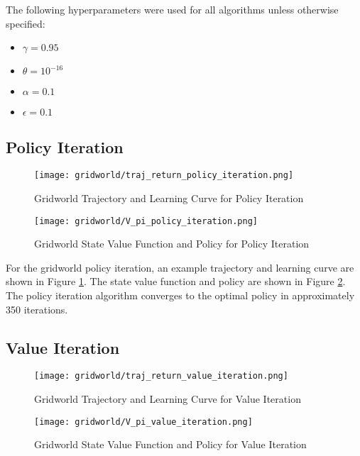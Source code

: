 The following hyperparameters were used for all algorithms unless otherwise specified:
\begin{itemize}
    \item $\gamma = 0.95$
    \item $\theta = 10^{-16}$
    \item $\alpha = 0.1$
    \item $\epsilon = 0.1$
\end{itemize}

\subsection*{Policy Iteration}
\begin{figure}[ht]
\centering
\texttt{[image: gridworld/traj\_return\_policy\_iteration.png]}
\caption{Gridworld Trajectory and Learning Curve for Policy Iteration}
\label{fig:gridworld_traj_return_policy_iteration}
\end{figure}

\begin{figure}[ht]
\centering
\texttt{[image: gridworld/V\_pi\_policy\_iteration.png]}
\caption{Gridworld State Value Function and Policy for Policy Iteration}
\label{fig:gridworld_V_pi_policy_iteration}
\end{figure}

For the gridworld policy iteration, an example trajectory and learning curve are shown in Figure \ref{fig:gridworld_traj_return_policy_iteration}. The state value function and policy are shown in Figure \ref{fig:gridworld_V_pi_policy_iteration}. The policy iteration algorithm converges to the optimal policy in approximately 350 iterations.

\subsection*{Value Iteration}
\begin{figure}[ht]
\centering
\texttt{[image: gridworld/traj\_return\_value\_iteration.png]}
\caption{Gridworld Trajectory and Learning Curve for Value Iteration}
\label{fig:gridworld_traj_return_value_iteration}
\end{figure}

\begin{figure}[ht]
\centering
\texttt{[image: gridworld/V\_pi\_value\_iteration.png]}
\caption{Gridworld State Value Function and Policy for Value Iteration}
\label{fig:gridworld_V_pi_value_iteration}
\end{figure}

